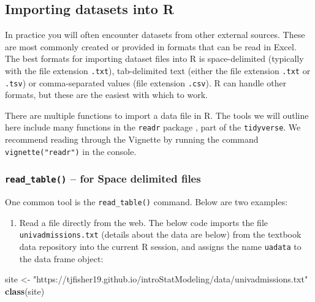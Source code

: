 \documentclass[
]{book}
\newenvironment{Shaded}{\begin{snugshade}}{\end{snugshade}}
\newcommand{\FunctionTok}[1]{\textcolor[rgb]{0.13,0.29,0.53}{\textbf{#1}}}
\newcommand{\NormalTok}[1]{#1}
\newcommand{\OtherTok}[1]{\textcolor[rgb]{0.56,0.35,0.01}{#1}}
\newcommand{\StringTok}[1]{\textcolor[rgb]{0.31,0.60,0.02}{#1}}
\providecommand{\tightlist}{%
  \setlength{\itemsep}{0pt}\setlength{\parskip}{0pt}}
\begin{document}
\hypertarget{importing-datasets-into-r}{%
\subsection{Importing datasets into R}\label{importing-datasets-into-r}}

In practice you will often encounter datasets from other external sources. These are most commonly created or provided in formats that can be read in Excel. The best formats for importing dataset files into R is space-delimited (typically with the file extension \texttt{.txt}), tab-delimited text (either the file extension \texttt{.txt} or \texttt{.tsv}) or comma-separated values (file extension \texttt{.csv}). R can handle other formats, but these are the easiest with which to work.

There are multiple functions to import a data file in R. The tools we will outline here include many functions in the \texttt{readr} package \citep{R-readr}, part of the \texttt{tidyverse}. We recommend reading through the Vignette by running the command \texttt{vignette("readr")} in the console.

\hypertarget{read_table-for-space-delimited-files}{%
\subsubsection{\texorpdfstring{\texttt{read\_table()} -- for Space delimited files}{read\_table() -- for Space delimited files}}\label{read_table-for-space-delimited-files}}

One common tool is the \texttt{read\_table()} command. Below are two examples:

\begin{enumerate}
\def\labelenumi{\arabic{enumi}.}
\tightlist
\item
  Read a file directly from the web. The below code imports the file \texttt{univadmissions.txt} (details about the data are below) from the textbook data repository into the current R session, and assigns the name \texttt{uadata} to the data frame object:
\end{enumerate}

\begin{Shaded}
\begin{Highlighting}[]
\NormalTok{site }\OtherTok{\textless{}{-}} \StringTok{"https://tjfisher19.github.io/introStatModeling/data/univadmissions.txt"}
\FunctionTok{class}\NormalTok{(site)}
\end{Highlighting}
\end{Shaded}
\end{document}
